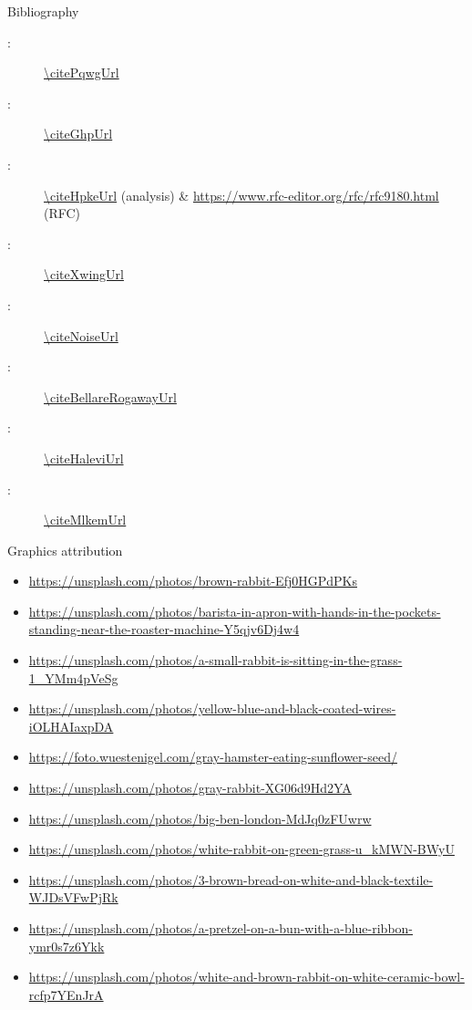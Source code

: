 
\begin{frame}{Bibliography}
  \begin{description}
    \item[\citePqwg:] \url{\citePqwgUrl}
    \item[\citeGhp:] \url{\citeGhpUrl}
    \item[\citeHpke:] \url{\citeHpkeUrl} (analysis) \& \url{https://www.rfc-editor.org/rfc/rfc9180.html} (RFC)
    \item[\citeXwing:] \url{\citeXwingUrl}
    \item[\citeNoise:] \url{\citeNoiseUrl}
    \item[\citeBellareRogaway:] \url{\citeBellareRogawayUrl}
    \item[\citeHalevi:]  \url{\citeHaleviUrl}
    \item[\citeMlkem:]  \url{\citeMlkemUrl}
  \end{description}
\end{frame}

\begin{frame}{Graphics attribution}
  \tiny
  \begin{itemize}
    \item \url{https://unsplash.com/photos/brown-rabbit-Efj0HGPdPKs}
    \item \url{https://unsplash.com/photos/barista-in-apron-with-hands-in-the-pockets-standing-near-the-roaster-machine-Y5qjv6Dj4w4}
    \item \url{https://unsplash.com/photos/a-small-rabbit-is-sitting-in-the-grass-1_YMm4pVeSg}
    \item \url{https://unsplash.com/photos/yellow-blue-and-black-coated-wires-iOLHAIaxpDA}
    \item \url{https://foto.wuestenigel.com/gray-hamster-eating-sunflower-seed/}
    \item \url{https://unsplash.com/photos/gray-rabbit-XG06d9Hd2YA}
    \item \url{https://unsplash.com/photos/big-ben-london-MdJq0zFUwrw}
    \item \url{https://unsplash.com/photos/white-rabbit-on-green-grass-u_kMWN-BWyU}
    \item \url{https://unsplash.com/photos/3-brown-bread-on-white-and-black-textile-WJDsVFwPjRk}
    \item \url{https://unsplash.com/photos/a-pretzel-on-a-bun-with-a-blue-ribbon-ymr0s7z6Ykk}
    \item \url{https://unsplash.com/photos/white-and-brown-rabbit-on-white-ceramic-bowl-rcfp7YEnJrA}
  \end{itemize}
\end{frame}

